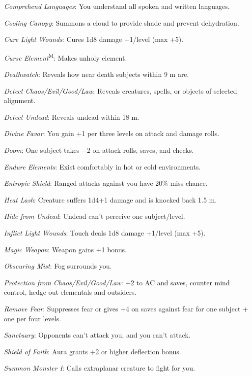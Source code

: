 \textit{Comprehend Languages}: You understand all spoken and written languages.

\textit{Cooling Canopy}: Summons a cloud to provide shade and prevent dehydration.

\textit{Cure Light Wounds}: Cures 1d8 damage +1/level (max +5).

\textit{Curse Element}\textsuperscript{M}: Makes unholy element.

\textit{Deathwatch}: Reveals how near death subjects within 9 m are.

\textit{Detect Chaos/Evil/Good/Law}: Reveals creatures, spells, or objects of selected alignment.

\textit{Detect Undead}: Reveals undead within 18 m.

\textit{Divine Favor}: You gain +1 per three levels on attack and damage rolls.

\textit{Doom}: One subject takes $-2$ on attack rolls, saves, and checks.

\textit{Endure Elements}: Exist comfortably in hot or cold environments.

\textit{Entropic Shield}: Ranged attacks against you have 20\% miss chance.

\textit{Heat Lash}: Creature suffers 1d4+1 damage and is knocked back 1.5 m.

\textit{Hide from Undead}: Undead can't perceive one subject/level.

\textit{Inflict Light Wounds}: Touch deals 1d8 damage +1/level (max +5).


\textit{Magic Weapon}: Weapon gains +1 bonus.

\textit{Obscuring Mist}: Fog surrounds you.

\textit{Protection from Chaos/Evil/Good/Law}: +2 to AC and saves, counter mind control, hedge out elementals and outsiders.

\textit{Remove Fear}: Suppresses fear or gives +4 on saves against fear for one subject + one per four levels.

\textit{Sanctuary}: Opponents can't attack you, and you can't attack.

\textit{Shield of Faith}: Aura grants +2 or higher deflection bonus.

\textit{Summon Monster I}: Calls extraplanar creature to fight for you.



